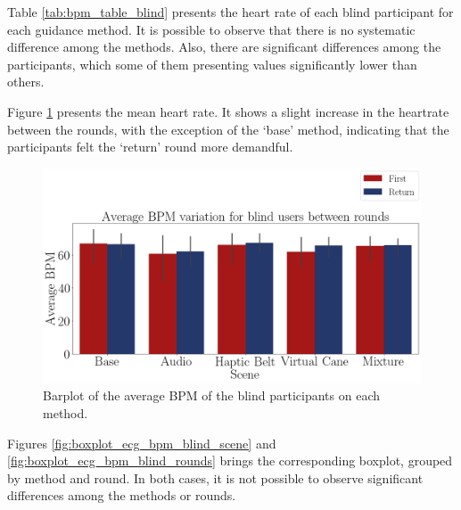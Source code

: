 Table \ref{tab:bpm_table_blind}  presents the heart rate of each blind participant for each guidance method. It is possible to observe that there is no systematic difference among the methods. Also, there are significant differences among the participants, which some of them presenting values significantly lower than others.



Figure \ref{fig:barplot_ecg_bpm_5_scene_blind} presents the mean heart rate. It shows a slight increase in the heartrate between the rounds, with the exception of the ‘base’ method, indicating that the participants felt the ‘return’ round more demandful.

\begin{figure}[!htb]
    \centering
    \includegraphics[width = 0.8\linewidth]{Resultados/ECG/Figuras/png/barplot_ecg_bpm_5_scene_blind.png}
    \caption{Barplot of the average BPM of the blind participants on each method.}
    \label{fig:barplot_ecg_bpm_5_scene_blind}
\end{figure}

% 
%

Figures \ref{fig:boxplot_ecg_bpm_blind_scene} and \ref{fig:boxplot_ecg_bpm_blind_rounds} brings the corresponding boxplot, grouped by method and round. In both cases, it is not possible to observe significant differences among the methods or rounds.

